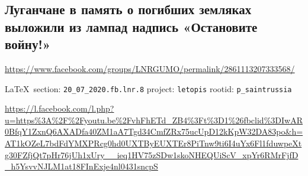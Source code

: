  
 
\subsection{Луганчане в память о погибших земляках выложили из лампад надпись «Остановите войну!»}
\url{https://www.facebook.com/groups/LNRGUMO/permalink/2861113207333568/}
  
\vspace{0.5cm}
{\small\LaTeX~section: \verb|20_07_2020.fb.lnr.8| project: \verb|letopis| rootid: \verb|p_saintrussia|}
\vspace{0.5cm}
  

\url{https://l.facebook.com/l.php?u=https%3A%2F%2Fyoutu.be%2FvhFhETd_ZB4%3Ft%3D1%26fbclid%3DIwAR0BfqY1ZxnQ6AXADfa40ZM1aA7Tgd34CmfZRx75ucUpD12kKpW32DA83po&h=AT1kOZeL7bdFdYMXPRcg0hd0UXTByEUXTEr8PiTnw9ti6I4uYx6Fl1fduwpeXtg30FZfjQt7pHr76jUh1xUry__ieq1HV75zSDw1skoNHEQUiScV_xpYr6RMrFjfD_h5YsvvNJLM1at18FInExje4nl0431sncpS}

